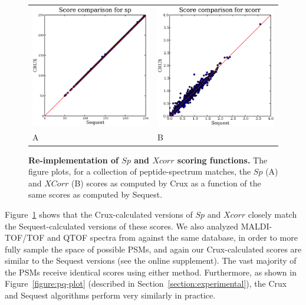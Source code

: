 \documentclass[12pt]{article}
\begin{document}
\begin{figure}
  \centering
  \begin{tabular}{ll}
    \includegraphics[width=3in]{./Images/random-sp.eps} &
    \includegraphics[width=3in]{./Images/random-xcorr.eps} \\
    {\sf A} & {\sf B}\\
  \end{tabular}
  \caption{{\bf Re-implementation of $Sp$ and $Xcorr$ scoring functions.}
  The figure plots, for a collection of peptide-spectrum matches, the
  $Sp$ ({\sf A}) and $XCorr$ ({\sf B}) scores as computed by Crux as a function of the
  same scores as computed by {\sc Sequest}.
  \label{figure:sp-xcorr}}
\end{figure}
Figure~\ref{figure:sp-xcorr} shows that the Crux-calculated versions
of $Sp$ and $Xcorr$ closely match the {\sc Sequest}-calculated
versions of these scores. We also analyzed 
MALDI-TOF/TOF and QTOF spectra from \citep{klimek:standard} against the
same database, in order to more fully sample the space of
possible PSMs, and again our Crux-calculated scores are similar to the
{\sc Sequest} versions (see the online supplement). The vast majority
of the PSMs receive identical scores using either method.
Furthermore, as shown in Figure~\ref{figure:pq-plot} (described in
Section~\ref{section:experimental}), the Crux and {\sc Sequest}
algorithms perform very similarly in practice.
\end{document}
